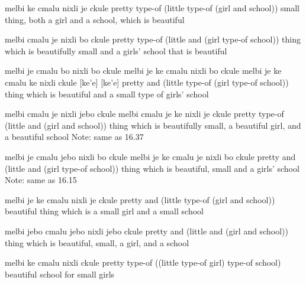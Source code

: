 \begin{example}
melbi ke cmalu nixli je ckule \n
pretty type-of (little type-of (girl and school))\n
small thing, both a girl and a school, which is beautiful
\end{example}

\begin{example}
melbi cmalu je nixli bo ckule\n
pretty type-of (little and (girl type-of school))\n
thing which is beautifully small\n
\T	and a girls' school that is beautiful
\end{example}

\begin{example}
melbi je cmalu bo nixli bo ckule\n
melbi je ke cmalu nixli bo ckule \n
melbi je ke cmalu ke nixli ckule [ke'e] [ke'e]\n
pretty and (little type-of (girl type-of school))\n
thing which is beautiful and a small type of\n
\T	girls' school
\end{example}

\begin{example}
melbi cmalu je nixli jebo ckule\n
melbi cmalu je ke nixli je ckule \n
pretty type-of (little and (girl and school))\n
thing which is beautifully small, a beautiful girl,\n
\T	and a beautiful school\n
Note: same as 16.37
\end{example}

\begin{example}
melbi je cmalu jebo nixli bo ckule\n
melbi je ke cmalu je nixli bo ckule \n
pretty and (little and (girl type-of school))\n
thing which is beautiful, small and a girls' school\n
Note: same as 16.15
\end{example}

\begin{example}
melbi je ke cmalu nixli je ckule \n
pretty and (little type-of (girl and school))\n
beautiful thing which is a small girl and a small school
\end{example}

\begin{example}
melbi jebo cmalu jebo nixli jebo ckule\n
pretty and (little and (girl and school))\n
thing which is beautiful, small, a girl, and a school
\end{example}

\begin{example}
melbi ke cmalu nixli ckule \n
pretty type-of ((little type-of girl) type-of school)\n
beautiful school for small girls
\end{example}

